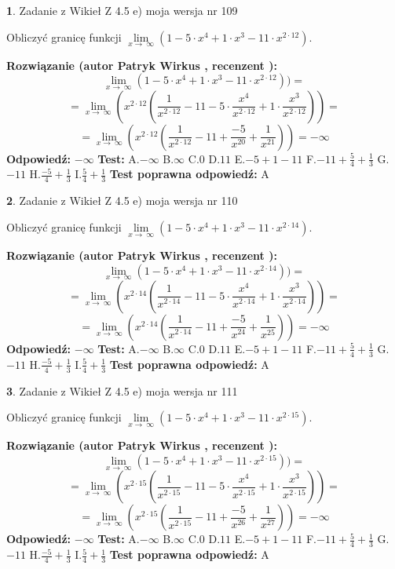 \documentclass[12pt, a4paper]{article}
\theoremstyle{definition} %
\newtheorem{zad}{}
\newcommand{\zadStart}[1]{\begin{zad}#1\newline}
\newcommand{\zadStop}{\end{zad}}
\newcommand{\rozwStart}[2]{\noindent \textbf{Rozwiązanie (autor #1 , recenzent #2): }\newline}
\newcommand{\rozwStop}{\newline}
\newcommand{\odpStart}{\noindent \textbf{Odpowiedź:}\newline}
\newcommand{\odpStop}{\newline}
\newcommand{\testStart}{\noindent \textbf{Test:}\newline}
\newcommand{\testStop}{\newline}
\newcommand{\kluczStart}{\noindent \textbf{Test poprawna odpowiedź:}\newline}
\newcommand{\kluczStop}{\newline}
\begin{document}
\zadStart{Zadanie z Wikieł Z 4.5 e) moja wersja nr 109}



Obliczyć granicę funkcji  $\lim\limits_{x\to\ \infty}(1 - 5 \cdot x^{4}+1 \cdot x^{3}- 11 \cdot x^{2\cdot12})$.
\zadStop
\rozwStart{Patryk Wirkus}{}
$$\lim\limits_{x\to\ \infty}(1 - 5 \cdot x^{4}+1 \cdot x^{3}- 11 \cdot x^{2\cdot12}))=$$
$$=\lim\limits_{x\to\ \infty}(x^{2\cdot12}(\frac{1}{x^{2\cdot12}}-11 -5 \cdot \frac{x^{4}}{x^{2\cdot12}}+1 \cdot \frac{x^{3}}{x^{2\cdot12}}))=$$
$$=\lim\limits_{x\to\ \infty}(x^{2\cdot12}(\frac{1}{x^{2\cdot12}}-11 + \frac{-5}{x^{20}}+ \frac{1}{x^{21}}))=-\infty$$
\rozwStop
\odpStart
$-\infty$
\odpStop
\testStart
A.$-\infty$ B.$\infty$ C.$0$ D.$11$ E.$-5 + 1 - 11$
F.$-11+\frac{5}{4}+\frac{1}{3}$ G.$-11$
H.$\frac{-5}{4}+\frac{1}{3}$
I.$\frac{5}{4}+\frac{1}{3}$
\testStop
\kluczStart
A
\kluczStop



\zadStart{Zadanie z Wikieł Z 4.5 e) moja wersja nr 110}



Obliczyć granicę funkcji  $\lim\limits_{x\to\ \infty}(1 - 5 \cdot x^{4}+1 \cdot x^{3}- 11 \cdot x^{2\cdot14})$.
\zadStop
\rozwStart{Patryk Wirkus}{}
$$\lim\limits_{x\to\ \infty}(1 - 5 \cdot x^{4}+1 \cdot x^{3}- 11 \cdot x^{2\cdot14}))=$$
$$=\lim\limits_{x\to\ \infty}(x^{2\cdot14}(\frac{1}{x^{2\cdot14}}-11 -5 \cdot \frac{x^{4}}{x^{2\cdot14}}+1 \cdot \frac{x^{3}}{x^{2\cdot14}}))=$$
$$=\lim\limits_{x\to\ \infty}(x^{2\cdot14}(\frac{1}{x^{2\cdot14}}-11 + \frac{-5}{x^{24}}+ \frac{1}{x^{25}}))=-\infty$$
\rozwStop
\odpStart
$-\infty$
\odpStop
\testStart
A.$-\infty$ B.$\infty$ C.$0$ D.$11$ E.$-5 + 1 - 11$
F.$-11+\frac{5}{4}+\frac{1}{3}$ G.$-11$
H.$\frac{-5}{4}+\frac{1}{3}$
I.$\frac{5}{4}+\frac{1}{3}$
\testStop
\kluczStart
A
\kluczStop



\zadStart{Zadanie z Wikieł Z 4.5 e) moja wersja nr 111}



Obliczyć granicę funkcji  $\lim\limits_{x\to\ \infty}(1 - 5 \cdot x^{4}+1 \cdot x^{3}- 11 \cdot x^{2\cdot15})$.
\zadStop
\rozwStart{Patryk Wirkus}{}
$$\lim\limits_{x\to\ \infty}(1 - 5 \cdot x^{4}+1 \cdot x^{3}- 11 \cdot x^{2\cdot15}))=$$
$$=\lim\limits_{x\to\ \infty}(x^{2\cdot15}(\frac{1}{x^{2\cdot15}}-11 -5 \cdot \frac{x^{4}}{x^{2\cdot15}}+1 \cdot \frac{x^{3}}{x^{2\cdot15}}))=$$
$$=\lim\limits_{x\to\ \infty}(x^{2\cdot15}(\frac{1}{x^{2\cdot15}}-11 + \frac{-5}{x^{26}}+ \frac{1}{x^{27}}))=-\infty$$
\rozwStop
\odpStart
$-\infty$
\odpStop
\testStart
A.$-\infty$ B.$\infty$ C.$0$ D.$11$ E.$-5 + 1 - 11$
F.$-11+\frac{5}{4}+\frac{1}{3}$ G.$-11$
H.$\frac{-5}{4}+\frac{1}{3}$
I.$\frac{5}{4}+\frac{1}{3}$
\testStop
\kluczStart
A
\kluczStop
\end{document}
